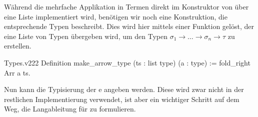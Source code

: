Während die mehrfache Applikation in Termen direkt im Konstruktor von  über eine Liste implementiert wird, benötigen wir noch eine Konstruktion, die entsprechende Typen beschreibt. Dies wird hier mittels einer Funktion  gelöst, der eine Liste von Typen übergeben wird, um den Typen $\sigma_1\to\ldots\to\sigma_n\to\tau$ zu erstellen.
\begin{code}{Types.v}{}{222}
Definition make_arrow_type (ts : list type) (a : type) :=
    fold_right Arr a ts.
\end{code}

Nun kann die Typisierung der e angeben werden. Diese wird zwar nicht in der restlichen Implementierung verwendet, ist aber ein wichtiger Schritt auf dem Weg, die Langableitung für  zu formulieren.

